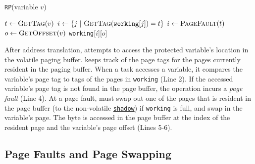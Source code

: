 \begin{algorithm}[t]
	\caption{\texttt{RP}(variable $v$)}
	\label{algo:rwar}
	\scriptsize
	\begin{algorithmic}[1]
		\State $t \leftarrow \Call{GetTag}{v}$ 
        \State $i \gets \{ j\ |\ \Call{GetTag}{\texttt{working}[j]} = t \}$ 
		 
		\State	$i \gets \Call{PageFault}{t}$ 
		\EndIf
		\State $o \leftarrow \Call{GetOffset}{v}$ 		
		\State \Return \texttt{working}[$i$][$o$]  
	\end{algorithmic}
\end{algorithm}

After address translation, \sys attempts to access the protected variable's location in the volatile paging buffer. \sys keeps track of the page tags for the pages currently resident in the paging buffer. When a task accesses a variable, it compares the variable's page tag to tags of the pages in {\tt working} (Line 2).
%
%
If the accessed variable's page tag is not found in the page buffer, the operation incurs a {\em page fault} (Line 4). At a page fault, \sys must swap out one of the pages that is resident in the page buffer (to the non-volatile \texttt{\underline{shadow}}) if \texttt{working} is full, and swap in the variable's page.
%
The byte is accessed in the page buffer at the index of the resident page and the variable's page offset (Lines 5-6).


\subsection{Page Faults and Page Swapping}


